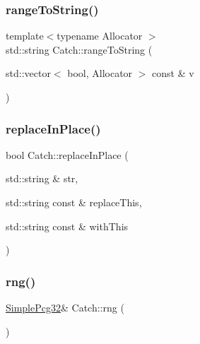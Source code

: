\mbox{\label{namespace_catch_ae162dc66b7767a52e7e4283915fd3d9f}} 
\subsubsection{\texorpdfstring{range\+To\+String()}{rangeToString()}\hspace{0.1cm}{\footnotesize\ttfamily [2/2]}}
{\footnotesize\ttfamily template$<$typename Allocator $>$ \\
std\+::string Catch\+::range\+To\+String (\begin{DoxyParamCaption}\item[{std\+::vector$<$ bool, Allocator $>$ const \&}]{v }\end{DoxyParamCaption})}

\mbox{\label{namespace_catch_afe4e6770da547e43e9e4eeaa05f946ea}} 
\subsubsection{\texorpdfstring{replace\+In\+Place()}{replaceInPlace()}}
{\footnotesize\ttfamily bool Catch\+::replace\+In\+Place (\begin{DoxyParamCaption}\item[{std\+::string \&}]{str,  }\item[{std\+::string const \&}]{replace\+This,  }\item[{std\+::string const \&}]{with\+This }\end{DoxyParamCaption})}

\mbox{\label{namespace_catch_aa184a4efe2aea62236528357d9342077}} 
\subsubsection{\texorpdfstring{rng()}{rng()}}
{\footnotesize\ttfamily \mbox{\hyperlink{class_catch_1_1_simple_pcg32}{Simple\+Pcg32}}\& Catch\+::rng (\begin{DoxyParamCaption}{ }\end{DoxyParamCaption})}

